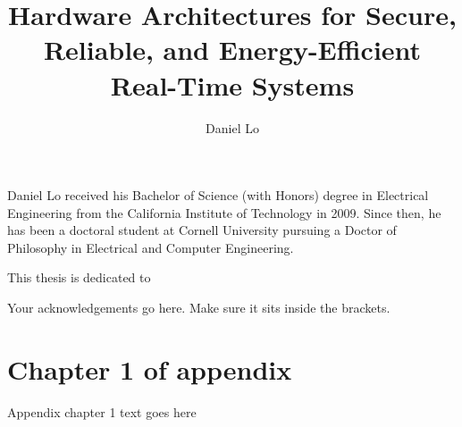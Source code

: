 \documentclass[phd,tocprelim]{cornell}
\title {Hardware Architectures for Secure, Reliable, and Energy-Efficient Real-Time Systems}
\author {Daniel Lo}
\begin{document}
\maketitle
\makecopyright

\begin{abstract}

\end{abstract}

\begin{biosketch}
Daniel Lo received his Bachelor of Science (with Honors) degree in Electrical
Engineering from the California Institute of Technology in 2009. Since then, he
has been a doctoral student at Cornell University pursuing a Doctor of
Philosophy in Electrical and Computer Engineering.
\end{biosketch}

\begin{dedication}
This thesis is dedicated to
\end{dedication}

\begin{acknowledgements}
Your acknowledgements go here. Make sure it sits inside the brackets.
\end{acknowledgements}

\contentspage
\tablelistpage
\figurelistpage

\normalspacing \setcounter{page}{1} 
\pagestyle{cornell} \addtolength{\parskip}{0.5\baselineskip}









\appendix
\chapter{Chapter 1 of appendix}
Appendix chapter 1 text goes here


\end{document}
